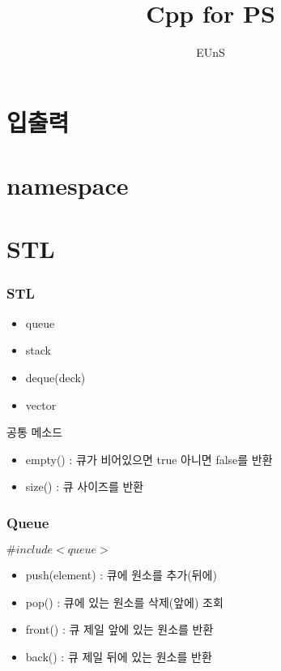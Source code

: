 \documentclass[10pt]{beamer}
\title{Cpp for PS}
\author{EUnS}
\begin{document}
\begin{frame}
  \maketitle
\end{frame}

\section{입출력}

\begin{frame}

\end{frame}


\section{namespace}

\begin{frame}

\end{frame}

\section{STL}

\begin{frame}
    \frametitle{STL}
    \begin{itemize}
        \item queue
        \item stack
        \item deque(deck)
        \item vector
    \end{itemize}
    공통 메소드
    \begin{itemize}
        \item empty() : 큐가 비어있으면 true 아니면 false를 반환
        \item size() : 큐 사이즈를 반환
    \end{itemize}
\end{frame}


\begin{frame}
    \frametitle{Queue}
    $\#include<queue>$
    \begin{itemize}
        \item push(element) : 큐에 원소를 추가(뒤에)
        \item pop() : 큐에 있는 원소를 삭제(앞에) 조회
        \item front() : 큐 제일 앞에 있는 원소를 반환
        \item back() : 큐 제일 뒤에 있는 원소를 반환
    \end{itemize}
\end{frame}
\end{document}
